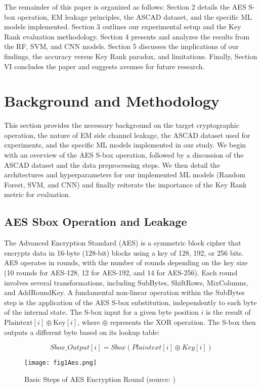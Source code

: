 \documentclass[runningheads]{llncs}
\begin{document}
The remainder of this paper is organized as follows: Section 2 details the AES S-box operation, EM leakage principles, the ASCAD dataset, and the specific ML models implemented. Section 3 outlines our experimental setup and the Key Rank evaluation methodology. Section 4 presents and analyzes the results from the RF, SVM, and CNN models. Section 5 discusses the implications of our findings, the accuracy versus Key Rank paradox, and limitations. Finally, Section VI concludes the paper and suggests avenues for future research.

\section{Background and Methodology}
This section provides the necessary background on the target cryptographic operation, the nature of EM side channel leakage, the ASCAD dataset used for experiments, and the specific ML models implemented in our study. We begin with an overview of the AES S-box operation, followed by a discussion of the ASCAD dataset and the data preprocessing steps. We then detail the architectures and hyperparameters for our implemented ML models (Random Forest, SVM, and CNN) and finally reiterate the importance of the Key Rank metric for evaluation. 
\subsection{AES \- Sbox Operation and Leakage }
The Advanced Encryption Standard (AES) is a symmetric block cipher that encrypts data in 16-byte (128-bit) blocks using a key of 128, 192, or 256 bits. AES operates in rounds, with the number of rounds depending on the key size (10 rounds for AES-128, 12 for AES-192, and 14 for AES-256). Each round involves several transformations, including SubBytes, ShiftRows, MixColumns, and AddRoundKey.\cite{huang2025deep} A fundamental non-linear operation within the SubBytes step is the application of the AES S-box substitution, independently to each byte of the internal state. The S-box input for a given byte position $i$ is the result of $\text{Plaintext}[i] \oplus \text{Key}[i]$, where $\oplus$ represents the XOR operation. The S-box then outputs a different byte based on its lookup table:

\begin{equation}
\textit{Sbox\_Output}[i] = \textit{Sbox} (\textit{Plaintext}[i] \oplus \textit{Key}[i])
\end{equation}

\begin{figure}[htbp]
    \centering
    \texttt{[image: fig1Aes.png]}
    \caption{Basic Steps of AES Encryption Round (source: \cite{aes_round_commons})}
    \label{fig:aes_steps}
\end{figure}
\end{document}
